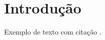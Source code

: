 \section{Introdução}
\label{sec:introducao}

\lipsum[1-2]

Exemplo de texto com citação \cite{stallings2008criptografia}.